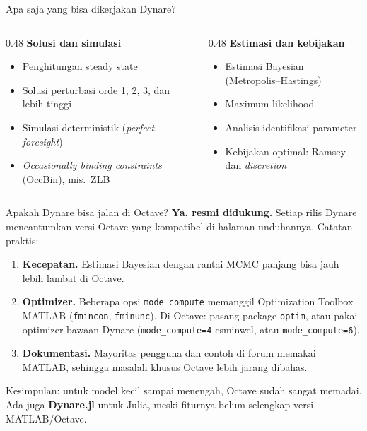 \documentclass[aspectratio=169,11pt]{beamer}
\begin{document}
\begin{frame}{Apa saja yang bisa dikerjakan Dynare?}
\begin{columns}[T]
\begin{column}{0.48\textwidth}
\textbf{Solusi dan simulasi}
\begin{itemize}\small
  \item Penghitungan steady state
  \item Solusi perturbasi orde 1, 2, 3, dan lebih tinggi
  \item Simulasi deterministik (\emph{perfect foresight})
  \item \emph{Occasionally binding constraints} (OccBin), mis.\ ZLB
\end{itemize}
\end{column}
\begin{column}{0.48\textwidth}
\textbf{Estimasi dan kebijakan}
\begin{itemize}\small
  \item Estimasi Bayesian (Metropolis--Hastings)
  \item Maximum likelihood
  \item Analisis identifikasi parameter
  \item Kebijakan optimal: Ramsey dan \emph{discretion}
\end{itemize}
\end{column}
\end{columns}
\end{frame}

\begin{frame}{Apakah Dynare bisa jalan di Octave?}
\textbf{Ya, resmi didukung.} Setiap rilis Dynare mencantumkan versi Octave
yang kompatibel di halaman unduhannya. Catatan praktis:
\vspace{0.3em}
\begin{enumerate}
  \item \textbf{Kecepatan.} Estimasi Bayesian dengan rantai MCMC panjang
        bisa jauh lebih lambat di Octave.
  \item \textbf{Optimizer.} Beberapa opsi \texttt{mode\_compute} memanggil
        Optimization Toolbox MATLAB (\texttt{fmincon}, \texttt{fminunc}).
        Di Octave: pasang package \texttt{optim}, atau pakai optimizer bawaan
        Dynare (\texttt{mode\_compute=4} csminwel, atau \texttt{mode\_compute=6}).
  \item \textbf{Dokumentasi.} Mayoritas pengguna dan contoh di forum memakai
        MATLAB, sehingga masalah khusus Octave lebih jarang dibahas.
\end{enumerate}
\vspace{0.3em}
\alert{Kesimpulan:} untuk model kecil sampai menengah, Octave sudah sangat
memadai. Ada juga \textbf{Dynare.jl} untuk Julia, meski fiturnya belum
selengkap versi MATLAB/Octave.
\end{frame}
\end{document}
